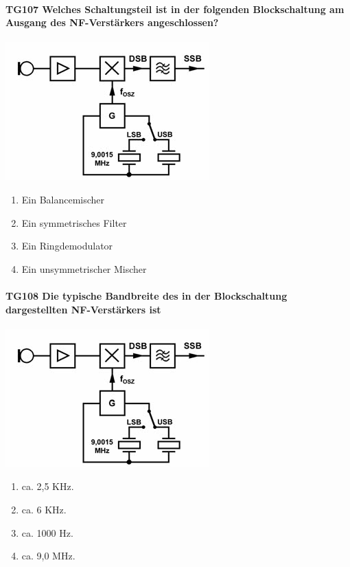 \documentclass[8pt]{article}
\begin{document}
\paragraph*{TG107 Welches Schaltungsteil ist in der folgenden Blockschaltung am Ausgang des NF-Verstärkers angeschlossen?}
\begin{center}
	\begin{minipage}{\linewidth}
		\centering
		\includegraphics[scale=1.0]{pics/tg107_a.jpg}
	\end{minipage}
\end{center}
\begin{enumerate}[nolistsep,label=\Alph*]
\item Ein Balancemischer
\item Ein symmetrisches Filter
\item Ein Ringdemodulator
\item Ein unsymmetrischer Mischer
\end{enumerate}

\paragraph*{TG108 Die typische Bandbreite des in der Blockschaltung dargestellten NF-Verstärkers ist}
\begin{center}
	\begin{minipage}{\linewidth}
		\centering
		\includegraphics[scale=1.0]{pics/tg108_a.jpg}
	\end{minipage}
\end{center}
\begin{enumerate}[nolistsep,label=\Alph*]
\item ca. 2,5 KHz.
\item ca. 6 KHz.
\item ca. 1000 Hz.
\item ca. 9,0 MHz.
\end{enumerate}
\end{document}

